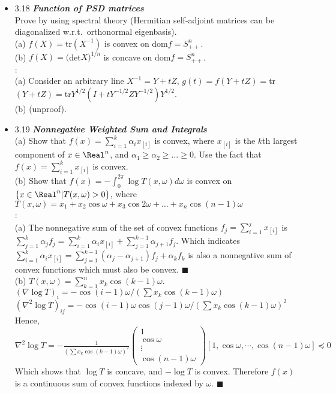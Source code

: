 \begin{itemize}
\item 3.18 {\color{red}\bf\emph{Function of PSD matrices}} \\ Prove by using spectral theory (Hermitian
self-adjoint matrices can be diagonalized w.r.t.\ orthonormal eigenbasis).\ \\ (a) $f(X) =
$tr$(X^{-1})$ is convex on dom$f = S^{n}_{++}$. \\ (b) $f(X) = ($det$X)^{1/n}$ is concave on dom$f =
S^{n}_{++}$. \\ \Proof: \\ (a) Consider an arbitrary line $X^{-1}=Y+tZ$, $g(t) = f(Y+tZ) =
$tr$(Y+tZ) = $tr$Y^{1/2}(I+tY^{-1/2}ZY^{-1/2})Y^{1/2}$. \\ (b) (unproof). \\ \item 3.19
{\bf\emph{Nonnegative Weighted Sum and Integrals}} \\ (a) Show that $f(x) = \sum_{i=1}^k \alpha_i
x_{[i]}$ is convex, where $x_{[i]}$ is the $k$th largest component of $x \in \Real^n$, and $\alpha_1
\ge \alpha_2 \ge \dotsc \ge 0$. Use the fact that $f(x) = \sum_{i=1}^k x_{[i]}$ is convex. \\ (b)
Show that $f(x) =
- \int_0^{2\pi} \log T(x,\omega) d\omega$ is convex on $\{x\in\Real^n| T(x,\omega)>0\}$, where
  $T(x,\omega)= x_1+x_2\cos\omega+x_3\cos2\omega+\dotsc+x_n\cos(n-1)\omega$ \\ \Proof: \\ (a) The
nonnegative sum of the set of convex functions $f_j = \sum_{i=1}^j x_{[i]}$ is
$\sum_{j=1}^k\alpha_jf_j = \sum_{i=1}^k \alpha_i x_{[i]} + \sum_{j=1}^{k-1}\alpha_{j+1}f_j$.  Which
indicates $\sum_{i=1}^k \alpha_i x_{[i]} = \sum_{j=1}^{k-1}(\alpha_j-\alpha_{j+1})f_j + \alpha_kf_k$
is also a nonnegative sum of convex functions which must also be convex. $\blacksquare$ \\ (b)
$T(x,\omega) = \sum_{k=1}^n x_k \cos(k-1)\omega$. \\ $(\nabla \log T)_i = -\cos(i-1)\omega/(\sum x_k
\cos(k-1)\omega)$ \\ $(\nabla^2 \log T)_{ij} = -\cos(i-1)\omega \cos(j-1)\omega/(\sum x_k
\cos(k-1)\omega)^2$ \\ Hence, $\nabla^2 \log T = -\frac{1}{(\sum x_k \cos(k-1)\omega)^2}
\begin{pmatrix} 1 \\ \cos\omega \\ \vdots \\ \cos(n-1)\omega \end{pmatrix} [1, \cos\omega, \cdots,
\cos(n-1)\omega] \preceq 0$  \\ Which shows that $\log T$ is concave, and $-\log T$ is convex.
Therefore $f(x)$ is a continuous sum of convex functions indexed by $\omega$. $\blacksquare$ \\


\end{itemize}
